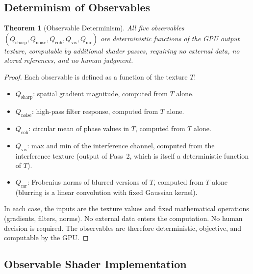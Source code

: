 \documentclass[11pt,twocolumn,a4paper]{article}
\newtheorem{theorem}{Theorem}[section]
\theoremstyle{definition}
\theoremstyle{remark}
\newcommand{\Qsharp}{Q_{\mathrm{sharp}}}
\newcommand{\Qnoise}{Q_{\mathrm{noise}}}
\newcommand{\Qcoh}{Q_{\mathrm{coh}}}
\newcommand{\Qvis}{Q_{\mathrm{vis}}}
\newcommand{\Qmr}{Q_{\mathrm{mr}}}
\begin{document}
\subsection{Determinism of Observables}

\begin{theorem}[Observable Determinism]
\label{thm:observable_determinism}
All five observables $(\Qsharp, \Qnoise, \Qcoh, \Qvis, \Qmr)$ are deterministic functions of the GPU output texture, computable by additional shader passes, requiring no external data, no stored references, and no human judgment.
\end{theorem}

\begin{proof}
Each observable is defined as a function of the texture $T$:
\begin{itemize}[nosep]
\item $\Qsharp$: spatial gradient magnitude, computed from $T$ alone.
\item $\Qnoise$: high-pass filter response, computed from $T$ alone.
\item $\Qcoh$: circular mean of phase values in $T$, computed from $T$ alone.
\item $\Qvis$: max and min of the interference channel, computed from the interference texture (output of Pass~2, which is itself a deterministic function of $T$).
\item $\Qmr$: Frobenius norms of blurred versions of $T$, computed from $T$ alone (blurring is a linear convolution with fixed Gaussian kernel).
\end{itemize}
In each case, the inputs are the texture values and fixed mathematical operations (gradients, filters, norms). No external data enters the computation. No human decision is required. The observables are therefore deterministic, objective, and computable by the GPU.
\end{proof}

\subsection{Observable Shader Implementation}
\end{document}
